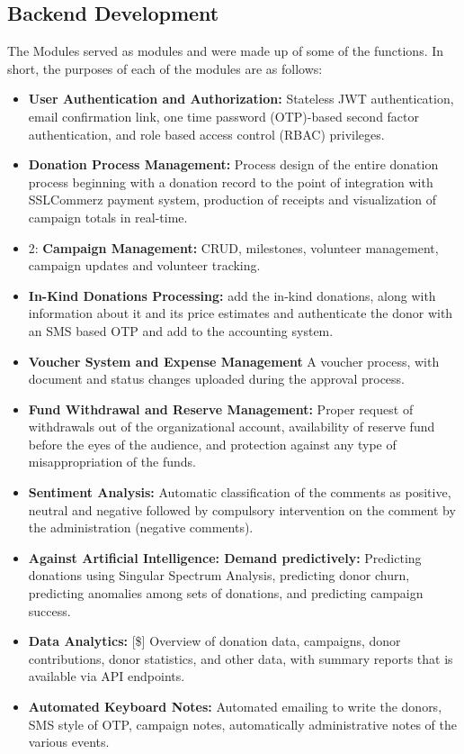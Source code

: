 \documentclass{thesis-library}
\begin{document}
\subsection{Backend Development}
The Modules served as modules and were made up of some of the functions. In short, the purposes of each of the modules are as follows:
\begin{itemize}
    \item \textbf{User Authentication and Authorization:} Stateless JWT authentication, email confirmation link, one time password (OTP)-based second factor authentication, and role based access control (RBAC) privileges\cite{jones2015jwt}.
    \item \textbf{Donation Process Management:} Process design of the entire donation process beginning with a donation record to the point of integration with SSLCommerz payment system, production of receipts and visualization of campaign totals in real-time.
    \item 2: \textbf{Campaign Management:} CRUD, milestones, volunteer management, campaign updates and volunteer tracking.
    \item \textbf{In-Kind Donations Processing:} add the in-kind donations, along with information about it and its price estimates and authenticate the donor with an SMS based OTP and add to the accounting system.
    \item \textbf{Voucher System and Expense Management} A voucher process, with document and status changes uploaded during the approval process.
    \item \textbf{Fund Withdrawal and Reserve Management:} Proper request of withdrawals out of the organizational account, availability of reserve fund before the eyes of the audience, and protection against any type of misappropriation of the funds.
    \item \textbf{Sentiment Analysis:} Automatic classification of the comments as positive, neutral and negative followed by compulsory intervention on the comment by the administration (negative comments).
    \item \textbf{Against Artificial Intelligence: Demand predictively:} Predicting donations using Singular Spectrum Analysis, predicting donor churn, predicting anomalies among sets of donations, and predicting campaign success.
    \item \textbf{Data Analytics:} [\$] Overview of donation data, campaigns, donor contributions, donor statistics, and other data, with summary reports that is available via API endpoints.
    \item \textbf{Automated Keyboard Notes:} Automated emailing to write the donors, SMS style of OTP, campaign notes, automatically administrative notes of the various events.
\end{itemize}
\end{document}
